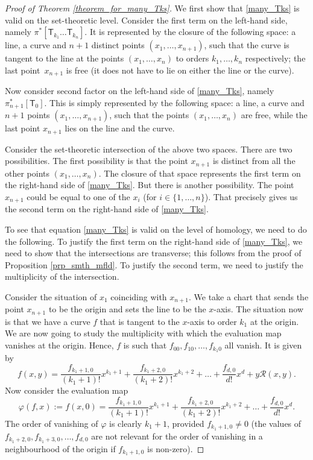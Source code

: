 \begin{proof}[Proof of Theorem \ref{theorem_for_many_Tks}]
We first show that \eqref{many_Tks} is valid on the set-theoretic level. Consider the first term
on the left-hand side, namely
$\pi^{\ast}[\mathsf{T}_{k_1}\dots \mathsf{T}_{k_n}]$.
It is represented by the closure of the following space: a line, a curve and
$n+1$ distinct points $(x_1,\dots, x_{n+1})$, such that the
curve is tangent to the line at the points
$(x_1,\dots, x_n)$ to orders $k_1,\dots, k_n$
respectively; the last point~$x_{n+1}$ is free (it does not have to lie on either the line or the curve).

Now consider second factor on the left-hand side of \eqref{many_Tks},
namely $\pi_{n+1}^{\ast}[\mathsf{T}_0]$.
This is simply represented by the following space: a
line, a curve and $n+1$ points $(x_1,\dots, x_{n+1})$,
such that the points $(x_1,\dots, x_n)$ are free, while the last point $x_{n+1}$ lies on the line
and the curve.

Consider the set-theoretic intersection of the above two spaces. There are two possibilities. The first
possibility is that the point $x_{n+1}$ is distinct from all the other points
$(x_1,\dots, x_n)$.
The closure of that space represents the first term on the right-hand side of
\eqref{many_Tks}. But there is another possibility. The point $x_{n+1}$ could be equal to one of the
$x_i$
(for $i \in \{1,\dots, n\}$).
That precisely gives us the second term on the right-hand side of \eqref{many_Tks}.

To see that equation \eqref{many_Tks} is valid on the level of homology,
we need to do the following.
To justify the first term on the right-hand side of \eqref{many_Tks},
we need to
show that the intersections are transverse;
this follows from the proof of Proposition \ref{prp_smth_mfld}.
To justify the second term,
we need to justify the multiplicity of the intersection.

Consider the situation of
$x_1$ coinciding with $x_{n+1}$. We take a chart that sends the point
$x_{n+1}$ to be the origin and sets the line to be the $x$-axis.
The situation now is that we have a curve $f$ that is tangent to the $x$-axis to order $k_1$
at the origin. We are now going to
study the multiplicity with which the evaluation map vanishes at the origin.
Hence, $f$ is such that $f_{00}, f_{10}, \dots , f_{k_1 0}$ all vanish. It is given by
\[
f(x, y)  =  \frac{f_{k_1+1, 0}}{(k_1+1)!} x^{k_1+1}
+\frac{f_{k_1+2, 0}}{(k_1+2)!} x^{k_1+2} + \dots +
\frac{f_{d, 0}}{d !} x^{d}  + y \mathcal{R}(x, y).
\]
Now consider the evaluation map
\[
\varphi(f, x) :=  f(x, 0)  = \frac{f_{k_1+1, 0}}{(k_1+1)!} x^{k_1+1}
+\frac{f_{k_1+2, 0}}{(k_1+2)!} x^{k_1+2} + \dots +
\frac{f_{d, 0}}{d !} x^{d}.
\]
The order of vanishing of $\varphi$ is clearly $k_1+1$, provided
$f_{k_1+1, 0} \neq 0$
(the values of $f_{k_1+2, 0}, f_{k_1+3, 0},\allowbreak \dots, f_{d,0}$ are not relevant for the order of vanishing
in a neighbourhood of the origin if $f_{k_1+1, 0}$ is non-zero).


\end{proof}
